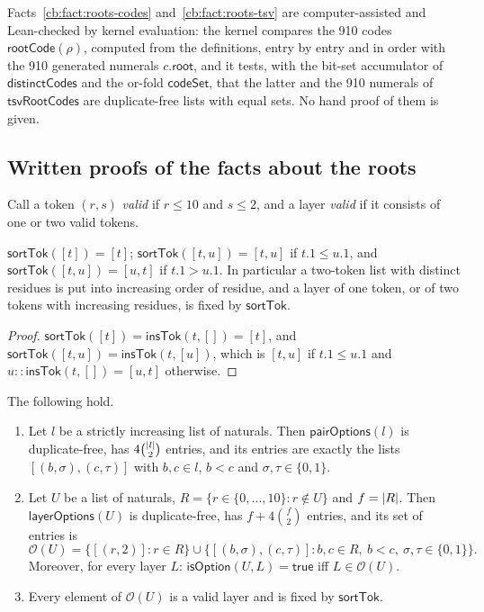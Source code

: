 Facts~\ref{cb:fact:roots-codes} and~\ref{cb:fact:roots-tsv} are computer-assisted and Lean-checked by kernel
evaluation: the kernel compares the 910 codes $\mathsf{rootCode}(\rho)$, computed from the definitions, entry by entry
and in order with the 910 generated numerals $c.\mathsf{root}$, and it tests, with the bit-set accumulator of
$\mathsf{distinctCodes}$ and the or-fold $\mathsf{codeSet}$, that the latter and the 910 numerals of
$\mathsf{tsvRootCodes}$ are duplicate-free lists with equal sets. No hand proof of them is given.

\subsection{Written proofs of the facts about the roots}\label{cb:sec:written}

Call a token $(r,s)$ \emph{valid} if $r\le10$ and $s\le2$, and a layer \emph{valid} if it consists of one or two valid
tokens.

\begin{lemma}\label{cb:lem:sort}
$\mathsf{sortTok}([t])=[t]$; $\mathsf{sortTok}([t,u])=[t,u]$ if $t.1\le u.1$, and $\mathsf{sortTok}([t,u])=[u,t]$ if
$t.1>u.1$. In particular a two-token list with distinct residues is put into increasing order of residue, and a layer
of one token, or of two tokens with increasing residues, is fixed by $\mathsf{sortTok}$.
\end{lemma}

\begin{proof}
$\mathsf{sortTok}([t])=\mathsf{insTok}(t,[])=[t]$, and $\mathsf{sortTok}([t,u])=\mathsf{insTok}(t,[u])$, which is
$[t,u]$ if $t.1\le u.1$ and $u\mathbin{::}\mathsf{insTok}(t,[])=[u,t]$ otherwise.
\end{proof}

\begin{lemma}\label{cb:lem:options}
The following hold.
\begin{enumerate}[label=(\alph*)]
\item Let $l$ be a strictly increasing list of naturals. Then $\mathsf{pairOptions}(l)$ is duplicate-free, has
  $4\binom{\lvert l\rvert}{2}$ entries, and its entries are exactly the lists $[(b,\sigma),(c,\tau)]$ with $b,c\in l$, $b<c$
  and $\sigma,\tau\in\{0,1\}$.
\item Let $U$ be a list of naturals, $R=\{r\in\{0,\dots,10\}:r\notin U\}$ and $f=\lvert R\rvert$. Then
  $\mathsf{layerOptions}(U)$ is duplicate-free, has $f+4\binom f2$ entries, and its set of entries is
  \[
  \mathcal O(U)=\{[(r,2)]:r\in R\}\cup\{[(b,\sigma),(c,\tau)]:b,c\in R,\ b<c,\ \sigma,\tau\in\{0,1\}\}.
  \]
  Moreover, for every layer $L$: $\mathsf{isOption}(U,L)=\mathsf{true}$ iff $L\in\mathcal O(U)$.
\item Every element of $\mathcal O(U)$ is a valid layer and is fixed by $\mathsf{sortTok}$.
\end{enumerate}
\end{lemma}

